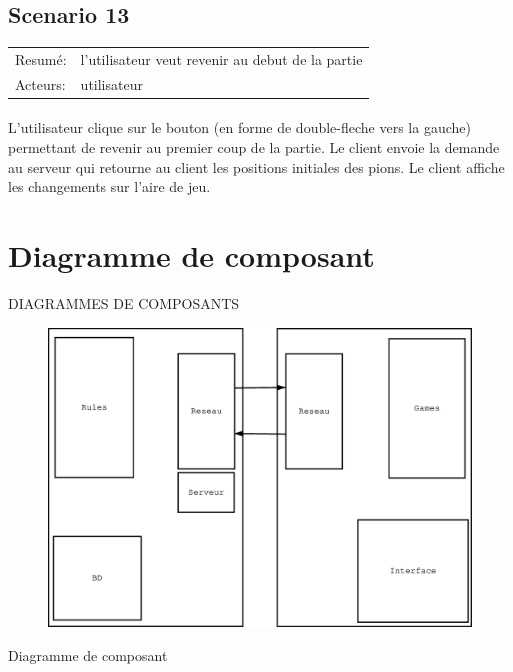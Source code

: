 \documentclass[french,12pt]{report}
\begin{document}
\subsection*{Scenario 13}

\begin{tabular}{ll}
  Resum\'e: & l'utilisateur veut revenir au debut de la partie \\
  Acteurs: & utilisateur
\end{tabular}

\paragraph{} 
  L'utilisateur clique sur le bouton (en forme de double-fleche 
vers la gauche) permettant de revenir au premier coup de la partie.
  Le client envoie la demande au serveur qui retourne au client 
les positions initiales des pions.
  Le client affiche les changements sur l'aire de jeu.

\pagebreak

\section*{Diagramme de composant}
{\uppercase{Diagrammes de composants}}

\begin{center}
\begin{figure}[h]
\includegraphics[width=16cm]{DdeC.eps}
\end{figure}

Diagramme de composant
\end{center}
\end{document}
